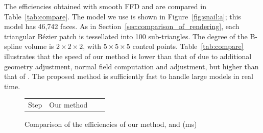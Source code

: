 \documentclass[3p]{elsarticle}
\makeatletter
\newcommand\tabcaption{\def\@captype{table}\caption}
\makeatother
\begin{document}
The efficiencies obtained with smooth FFD and \cite{Cui13, Cui14} are compared in Table~\ref{tab:compare}. The model we
use is shown in Figure~\ref{fig:snail:a}; this model has 46,742 faces. As in Section~\ref{sec:comparison_of_rendering},
each triangular B\'ezier patch is tessellated into 100 sub-triangles. The degree of the B-spline volume is
$2\times2\times2$, with $5\times5\times5$ control points. Table~\ref{tab:compare} illustrates that the speed of our
method is lower than that of \cite{Cui14} due to additional geometry adjustment, normal field computation and
adjustment, but higher than that of \cite{Cui13}. The proposed method is sufficiently fast to handle large models in
real time.

\begin{figure}[htb] 
  \begin{minipage}[c]{0.29\textwidth} 
		\centering
		\caption{Shading results for smooth FFD and UUS algorithm}
		\label{fig:snail}
  \end{minipage}
  \begin{minipage}[c]{0.7\textwidth} 
	\centering
	\footnotesize
	\tabcaption{Comparison of the efficiencies of our method, \cite{Cui13} and \cite{Cui14} (ms)}
	\begin{tabular}{llll}
		\hline
		Step & Our method & \cite{Cui13} & \cite{Cui14}\\

\end{tabular}
\end{minipage}
\end{figure}
\end{document}
